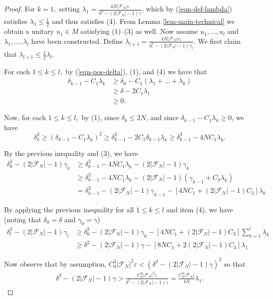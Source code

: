 \documentclass[10pt]{amsart}
\numberwithin{equation}{section}
\theoremstyle{definition}
\newcommand{\cF}{\mathcal{F}}
\newcommand{\ee}{\varepsilon}
\begin{document}
\begin{proof}
    For $k=1,$ setting $\lambda_1 =  \frac{4N|\cF_N|\ee}{\delta^2 - (2|\cF_N|-1)\gamma}$, which by (\ref{eqn-def-lambda}) satisfies $\lambda_1\le \frac12$ and thus satisfies (4). From Lemma \ref{lem-main-technical} we obtain a unitary $u_1\in M$ satisfying (1)--(3) as well. Now assume $u_1,\ldots, u_l$ and $\lambda_1,\ldots,\lambda_l$ have been constructed. Define $\lambda_{l+1} = \frac{4N|\cF_N|\ee_l}{\delta_l^2 - (2|\cF_N|-1)\gamma_l}$. We first claim that $\lambda_{l+1} \le \frac{1}{2}\lambda_l$. 

    For each $1\le k \le l,$ by (\ref{eqn-pos-delta}), (1), and (4) we have that 
    \begin{align*}
        \delta_{k-1} - C_1\lambda_k &\ge \delta_0 - C_1(\lambda_1 + \ldots + \lambda_k)\\
        &\ge \delta - 2C_1\lambda_1\\
        &\ge 0.
    \end{align*}

    Now, for each $1\le k\le l,$ by (1), since $\delta_k \le 2N$, and since $\delta_{k-1}-C_1\lambda_k\ge 0$, we have
    \begin{equation*}
        \delta_k^2 \ge (\delta_{k-1}- C_1\lambda_k)^2 \ge \delta_{k-1}^2 - 2C_1\delta_{k-1}\lambda_k \ge \delta^2_{k-1} - 4NC_1\lambda_k.
    \end{equation*}

    By the previous inequality and (3), we have
    \begin{align*}
        \delta_k^2 - (2|\cF_N|-1)\gamma_k &\ge \delta^2_{k-1} - 4NC_1\lambda_k - (2|\cF_N|-1)\gamma_k \\
        &\ge \delta^2_{k-1} - 4NC_1\lambda_k - (2|\cF_N|-1)(\gamma_{k-1} + C_3\lambda_k) \\
        &= \delta^2_{k-1}  - (2|\cF_N|-1)\gamma_{k-1} - [4NC_1 + (2|\cF_N|-1)C_3]\lambda_k
    \end{align*}

    By applying the previous inequality for all $1\le k\le l$ and item (4), we have (noting that $\delta_0=\delta$ and $\gamma_0=\gamma$)
    \begin{align*}
         \delta_l^2 - (2|\cF_N|-1)\gamma_l &\ge \delta_0^2 - (2|\cF_N|-1)\gamma_0 - [4NC_1 + (2|\cF_N|-1)C_3]\sum_{k=1}^l\lambda_k\\
         &\ge \delta^2 - (2|\cF_N|-1)\gamma - [8NC_1 + 2(2|\cF_N|-1)C_3]\lambda_1 
    \end{align*}

    Now observe that by assumption, $C_0^2|\cF_N|^2\ee < (\delta^2 - (2|\cF_N|-1)\gamma)^2$ so that 
    \begin{align*}
        \delta^2 - (2|\cF_N|-1)\gamma > \frac{C_0^2|\cF_N|^2\ee}{\delta^2 - (2|\cF_N|-1)\gamma} = \frac{C_0^2|\cF_N|}{4N}\lambda_1.
    \end{align*}


\end{proof}
\end{document}
